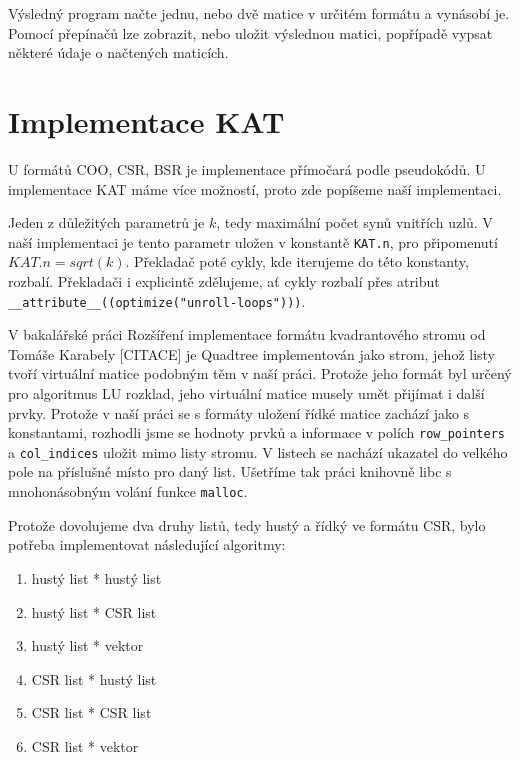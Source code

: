 Výsledný program načte jednu, nebo dvě matice v určitém formátu a vynásobí je. Pomocí přepínačů lze zobrazit, nebo uložit výslednou matici, popřípadě vypsat některé údaje o načtených maticích.


\section{Implementace KAT}

U formátů COO, CSR, BSR je implementace přímočará podle pseudokódů. U implementace KAT máme více možností, proto zde popíšeme naší implementaci.

Jeden z důležitých parametrů je $k$, tedy maximální počet synů vnitřích uzlů. V naší implementaci je tento parametr uložen v konstantě \texttt{KAT.n}, pro připomenutí $KAT.n = sqrt(k)$. Překladač poté cykly, kde iterujeme do této konstanty, rozbalí. Překladači i explicintě zdělujeme, ať cykly rozbalí přes atribut \texttt{\_\_attribute\_\_((optimize("unroll-loops")))}.

V bakalářské práci Rozšíření implementace formátu kvadrantového stromu od Tomáše Karabely [CITACE] je Quadtree implementován jako strom, jehož listy tvoří virtuální matice podobným těm v naší práci. Protože jeho formát byl určený pro algoritmus LU rozklad, jeho virtuální matice musely umět přijímat i další prvky. Protože v naší práci se s formáty uložení řídké matice zachází jako s konstantami, rozhodli jsme se hodnoty prvků a informace v polích \texttt{row\_pointers} a \texttt{col\_indices} uložit mimo listy stromu. V listech se nachází ukazatel do velkého pole na příslušné místo pro daný list. Ušetříme tak práci knihovně libc s mnohonásobným volání funkce \texttt{malloc}.

Protože dovolujeme dva druhy listů, tedy hustý a řídký ve formátu CSR, bylo potřeba implementovat následující algoritmy:

\begin{enumerate}
  \item hustý list * hustý list
  \item hustý list * CSR list
  \item hustý list * vektor
  \item CSR list * hustý list
  \item CSR list * CSR list
  \item CSR list * vektor
\end{enumerate}

